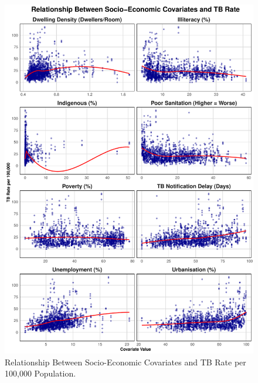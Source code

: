 \documentclass[
  11pt,
  a4paper,11pt]{article}
\begin{document}
\begin{figure}
\centering
\includegraphics{Project_clean_files/figure-latex/Figure-1-1.pdf}
\caption{Relationship Between Socio-Economic Covariates and TB Rate per
100,000 Population.}
\end{figure}
\end{document}
